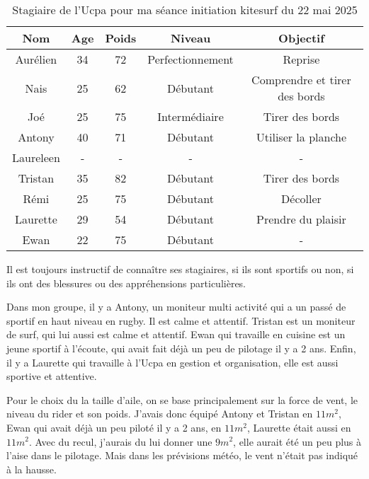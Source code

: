 \documentclass[11pt,a4paper]{report}
\begin{document}
\begin{table}
\begin{tabular}{|c|c|c|c|c|}
        \hline
        \textbf{Nom} & \textbf{Age} & \textbf{Poids}& \textbf{Niveau}     &  \textbf{Objectif} \\ 
        \hline
        Aurélien      &  34          &  72           &   Perfectionnement  & Reprise \\
        Nais          &  25          &  62           &   Débutant          & Comprendre et tirer des bords \\
        Joé         &  25          &  75           &   Intermédiaire     & Tirer des bords \\
        Antony        &  40          &  71           &   Débutant          & Utiliser la planche  \\
        Laureleen     &  -           &  -            &   -                 &   -  \\
        Tristan       &  35          & 82            &  Débutant           & Tirer des bords  \\
        Rémi          &  25          & 75            &  Débutant           &  Décoller  \\
        Laurette      &  29          & 54            &  Débutant           & Prendre du plaisir \\
        Ewan          &  22          & 75            & Débutant            &  -  \\
        \hline
\end{tabular}
\caption{Stagiaire de l'Ucpa pour ma séance initiation kitesurf du 22 mai 2025\label{stagiaires_table}}
\end{table}

Il est toujours instructif de connaître ses stagiaires, si ils sont 
sportifs ou non, si ils ont des blessures ou des appréhensions particulières.

Dans mon groupe, il y a Antony, un moniteur multi activité qui a un passé 
de sportif en haut niveau en rugby. Il est calme et attentif.
Tristan est un moniteur de surf, qui lui aussi est calme et attentif.
Ewan qui travaille en cuisine est un jeune sportif à l'écoute, qui avait 
fait déjà un peu de pilotage il y a 2 ans.
Enfin, il y a Laurette qui travaille à l'Ucpa en gestion et 
organisation, elle est aussi  sportive et attentive.

Pour le choix du la taille d'aile, on se base principalement sur la force
de vent, le niveau du rider et son poids. J'avais donc équipé Antony et Tristan
en $11 m^2$, Ewan qui avait déjà un peu piloté il y a 2 ans, en $11 m^2$,
 Laurette était aussi en $11 m^2$.
Avec du recul, j'aurais du lui donner une  $9 m^2$, elle aurait été un peu plus
à l'aise dans le pilotage. Mais dans les prévisions météo, le vent n'était pas
indiqué à la hausse.
\end{document}
